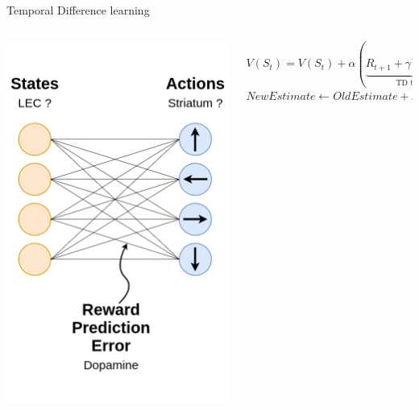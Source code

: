 \documentclass[bigger]{beamer}
\begin{document}
\begin{frame}[label={sec:org60e9efd}]{Temporal Difference learning}
\begin{columns}
\begin{column}{0.5\columnwidth}
\begin{center}
\includegraphics[height=0.8\textheight]{./img/RL_mapping.drawio.png}
\end{center}
\end{column}
\begin{column}{0.5\columnwidth}
\begin{adjustbox}{max width=\columnwidth, keepaspectratio}
$V(S_t) = V(S_t) + \alpha(\underbrace{R_{t+1} + \gamma V(S_{t+1})}_\text{TD target} - V(S_t))$
\end{adjustbox}\\[1em]
\begin{adjustbox}{max width=\columnwidth, keepaspectratio}
$NewEstimate \leftarrow OldEstimate + StepSize[Target - OldEstimate]$
\end{adjustbox}
\end{column}
\end{columns}
\end{frame}
\end{document}
